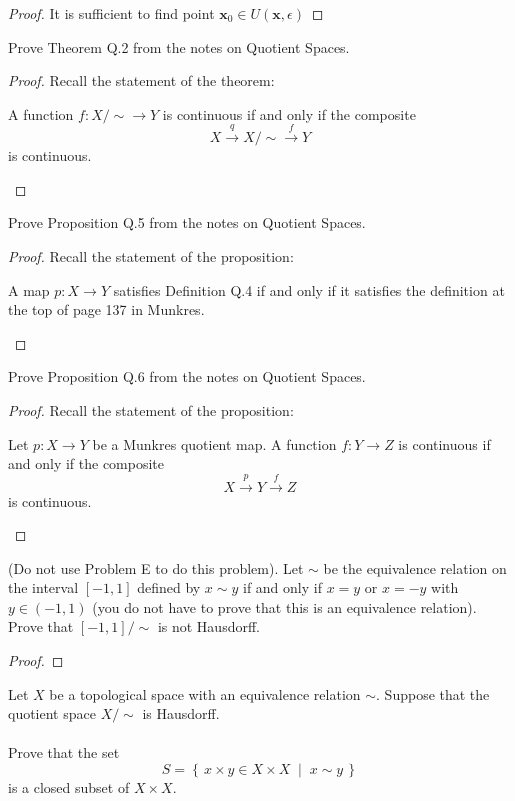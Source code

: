 \begin{proof}
It is sufficient to find point $\mathbf{x}_0\in U(\mathbf{x},\epsilon)$
\end{proof}
\newpage
\begin{problem}[A]
Prove Theorem Q.2 from the notes on Quotient Spaces.
\end{problem}
\begin{proof}
Recall the statement of the theorem:
\begin{theorem*}[Theorem Q.2]
A function $f\colon X/{\sim}\to Y$ is continuous if and only if
the composite
\[
X\overset{q}{\longrightarrow}X/{\sim}\overset{f}{\longrightarrow}Y
\]
is continuous.
\end{theorem*}
\end{proof}
\newpage
\begin{problem}[B]
Prove Proposition Q.5 from the notes on Quotient Spaces.
\end{problem}
\begin{proof}
Recall the statement of the proposition:
\begin{proposition*}[Proposition Q.5]
A map $p\colon X\to Y$ satisfies Definition Q.4 if and only if it
satisfies the definition at the top of page 137 in Munkres.
\end{proposition*}
\end{proof}
\newpage
\begin{problem}[C]
Prove Proposition Q.6 from the notes on Quotient Spaces.
\end{problem}
\begin{proof}
Recall the statement of the proposition:
\begin{proposition*}[Proposition Q.6]
Let $p\colon X\to Y$ be a Munkres quotient map. A function
$f\colon Y\to Z$ is continuous if and only if the composite
\[
X\overset{p}{\longrightarrow}Y\overset{f}{\longrightarrow}Z
\]
is continuous.
\end{proposition*}
\end{proof}
\newpage
\begin{problem}[D]
(Do not use Problem E to do this problem). Let $\sim$ be the
equivalence relation on the interval $[-1,1]$ defined by $x\sim
y$ if and only if $x=y$ or $x=-y$ with $y\in(-1,1)$ (you do not
have to prove that this is an equivalence relation). Prove that
$[-1,1]/{\sim}$ is not Hausdorff.
\end{problem}
\begin{proof}
\end{proof}
\newpage
\begin{problem}[E]
Let $X$ be a topological space with an equivalence relation
$\sim$. Suppose that the quotient space $X/\sim$ is Hausdorff.
\\\\
Prove that the set
\[
S=\left\{\,x\times y\in X\times X\;\middle|\;x\sim y\,\right\}
\]
is a closed subset of $X\times X$.
\end{problem}
